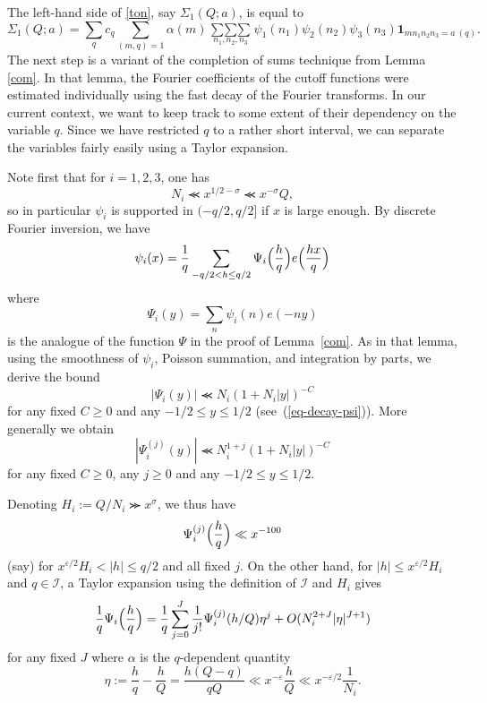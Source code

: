 \documentclass[12pt,a4paper,reqno]{amsart}
\numberwithin{equation}{section}
\theoremstyle{plain}
\theoremstyle{definition}
\newcommand\eps{\varepsilon}
\newcommand\trpsum{\mathop{\sum\sum\sum}\limits}
\newcommand{\ftd}{\mathcal{I}}
\renewcommand{\lessapprox}{\llcurly}
\newcommand{\onef}{\mathbf{1}}
\begin{document}
The left-hand side of \eqref{ton}, say $\Sigma_1(Q;a)$, is equal to
\begin{equation}\label{tin}
  \Sigma_1(Q;a)=
  \sum_q c_q \sum_{(m,q)=1} \alpha(m) \trpsum_{n_1,n_2,n_3} 
  \psi_1(n_1) \psi_2(n_2) \psi_3(n_3) \onef_{mn_1n_2n_3 = a\ (q)}.
\end{equation}
The next step is a variant of the completion of sums technique from
Lemma \ref{com}.  In that lemma, the Fourier coefficients of the
cutoff functions were estimated individually using the fast decay of
the Fourier transforms. In our current context, we want to keep track
to some extent of their dependency on the variable $q$. Since we have
restricted $q$ to a rather short interval, we can separate the
variables fairly easily using a Taylor expansion.
\par
Note first that for $i=1,2,3$, one has
$$ 
N_i \lessapprox x^{1/2-\sigma} \lessapprox x^{-\sigma} Q,
$$
so in particular $\psi_i$ is supported in $(-q/2,q/2]$ if $x$ is large
enough.  By discrete Fourier inversion, we have
\begin{equation}\label{dfi}
\psi_i(x)=\frac{1}{q}\sum_{-q/2<h\leq
  q/2}\Psi_i\Bigl(\frac{h}{q}\Bigr) e\Big(\frac{hx}{q}\Bigr)
\end{equation}
where
$$
\Psi_i(y)=\sum_n{\psi_i(n)e(-ny)}
$$
is the analogue of the function $\Psi$ in the proof of
Lemma~\ref{com}. As in that lemma, using the smoothness of $\psi_i$,
Poisson summation, and integration by parts, we derive the bound
$$ 
|\Psi_i(y)| \lessapprox N_i (1 + N_i |y|)^{-C}
$$
for any fixed $C \geq 0$ and any $-1/2 \leq y \leq 1/2$
(see~(\ref{eq-decay-psi})). More generally we obtain
$$ 
|\Psi^{(j)}_i(y)| \lessapprox N_i^{1+j} (1 + N_i |y|)^{-C}
$$
for any fixed $C\geq 0$, any $j \geq 0$ and any $-1/2 \leq y \leq
1/2$.  
\par
Denoting $H_i:=Q/N_i\ggcurly x^{\sigma}$, we thus have
$$
\Psi_i^{(j)}\Bigl(\frac{h}{q}\Bigr) \ll x^{-100}
$$
(say) for $x^{\eps/2} H_i < |h| \leq q/2$ and all fixed $j$.  On the other hand, for
$|h| \leq x^{\eps/2} H_i$ and $q\in \ftd$, a Taylor expansion using the definition of $\ftd$ and $H_i$ gives
$$
\frac{1}{q} \Psi_i\Bigl(\frac{h}{q}\Bigr)=
\frac{1}{q}\sum_{j=0}^J\frac{1}{j!}\Psi_i^{(j)}(h/Q)\eta^j
+O(N_i^{2+J}|\eta|^{J+1})
$$
for any fixed $J$ where $\alpha$ is the $q$-dependent quantity
$$
\eta:=\frac{h}{q}-\frac{h}{Q} =\frac{h(Q-q)}{qQ}\ll
x^{-\eps}\frac{h}{Q} \ll x^{-\eps/2}\frac{1}{N_i}.
$$
\end{document}
